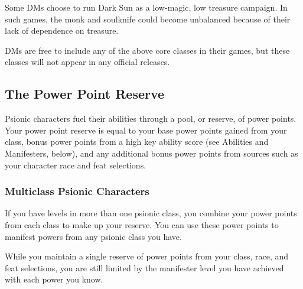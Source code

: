 Some DMs choose to run {\tableheader Dark Sun} as a low-magic, low treasure campaign. In such games, the monk and soulknife could become unbalanced because of their lack of dependence on treasure.

DMs are free to include any of the above core classes in their games, but these classes will not appear in any official releases.

\subsection{The Power Point Reserve}
Psionic characters fuel their abilities through a pool, or reserve, of power points. Your power point reserve is equal to your base power points gained from your class, bonus power points from a high key ability score (see Abilities and Manifesters, below), and any additional bonus power points from sources such as your character race and feat selections.

\subsubsection{Multiclass Psionic Characters}
If you have levels in more than one psionic class, you combine your power points from each class to make up your reserve. You can use these power points to manifest powers from any psionic class you have.

While you maintain a single reserve of power points from your class, race, and feat selections, you are still limited by the manifester level you have achieved with each power you know.















